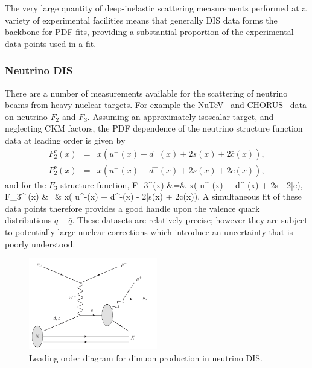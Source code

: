 The very large quantity of deep-inelastic scattering measurements performed at a variety of experimental facilities means that generally DIS data forms the backbone for PDF fits, providing a substantial proportion of the experimental data points used in a fit.

\subsubsection{Neutrino DIS}
There are a number of measurements available for the scattering of neutrino beams from heavy nuclear targets. For example the NuTeV~\cite{Tzanov:2005kr} and CHORUS~\cite{Onengut:2005kv} data on neutrino $F_2$ and $F_3$. Assuming an approximately isoscalar target, and neglecting CKM factors, the PDF dependence of the neutrino structure function data at leading order is given by~\cite{Forte:2013wc}
\begin{eqnarray}
	F_2^\nu(x) &=& x\left( u^+(x) + d^+(x) + 2s(x) + 2\bar{c}(x)\right), \\
	F_2^{\bar{\nu}}(x) &=& x\left( u^+(x) + d^+(x) + 2\bar{s}(x) + 2c(x)\right),
\end{eqnarray}
and for the $F_3$ structure function,
\ba
	F_3^\nu(x) &=& x\left( u^-(x) + d^-(x) + 2s - 2\bar{c}\right), \\
	F_3^{\bar{\nu}}(x) &=& x\left( u^-(x) + d^-(x) - 2\bar{s}(x) + 2c(x)\right).
\ea
A simultaneous fit of these data points therefore provides a good handle upon the valence quark distributions $q-\bar{q}$. These datasets are relatively precise; however they are subject to potentially large nuclear corrections which introduce an uncertainty that is poorly understood.

\begin{figure}[ht]
\centering
\includegraphics[width=0.5\textwidth]{3-PDFdet/figs/dimuon.pdf}
\caption[Leading order diagram for dimuon production in neutrino DIS]{Leading order diagram for dimuon production in neutrino DIS.}
\label{fig:dimuon}
\end{figure}

